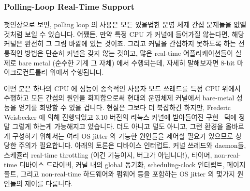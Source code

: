 \subsubsection{Polling-Loop Real-Time Support}
\label{sec:advsync:Polling-Loop Real-Time Support}

첫인상으로 보면, polling loop 의 사용은 모든 있을법한 운영 체제 간섭 문제들을
없앨 것처럼 보일 수 있습니다.
어쨌든, 만약 특정 CPU 가 커널에 들어가질 않는다면, 해당 커널은 완전히 그 그림
바깥에 있는 것이죠.
그리고 커널을 간섭하지 못하도록 하는 전통적인 방법은 단순히 커널을 갖지 않는
것이고, 많은 real-time 어플리케이션들이 실제로 bare metal (순수한 기계 그 자체)
에서 수행되는데, 자세히 말해보자면 8-bit 마이크로컨트롤러 위에서 수행됩니다.

어떤 분은 하나의 CPU 에 성능이 종속적인 사용자 모드 쓰레드를 특정 CPU 위에서
수행하고 모든 간섭의 원인을 회피함으로써 현대의 운영체제 커널에서 bare-metal
성능을 얻기를 희망할 수 있을 겁니다.
현실은 그보다 더 북잡하긴 하지만, Frederic Weisbecker 에 의해 진행되었고 3.10
버전의 리눅스 커널에 받아들여진 
구현~\cite{JonCorbet2013NO-HZ-FULL} 덕에 정말 그렇게 하는게 가능해지고
있습니다.
더도 아니고 덜도 아니고, 그런 환경을 올바르게 구성하기 위해서는 여러 OS jitter
의 가능한 원인들을 제어할 필요가 있으므로 상당한 주의가 필요합니다.
아래의 토론은 디바이스 인터럽트, 커널 쓰레드와 daemon들, 스케쥴러 real-time
throttling (이건 기능이지, 버그가 아닙니다!), 타이머, non-real-time 디바이스
드라이버, 커널 내의 global 동기화, scheduling-clock 인터럽트, 페이지 폴트,
그리고 non-real-time 하드웨어와 펌웨어 등을 포함하는 OS jitter 의 몇가지
원인들의 제어를 다룹니다. 

